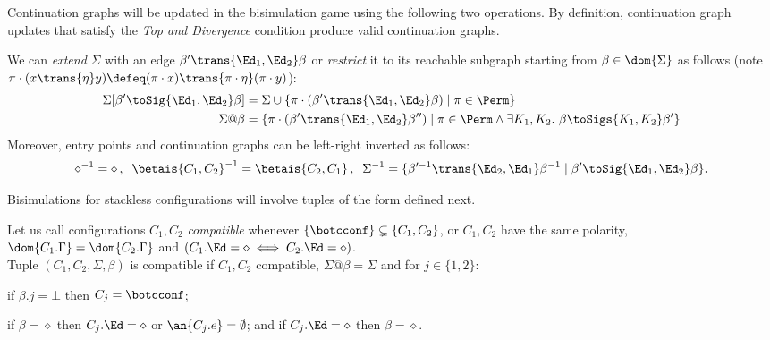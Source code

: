 Continuation graphs will be updated in the bisimulation game using the following two operations.
{By definition, continuation graph updates that satisfy the \emph{Top and Divergence} condition produce valid continuation graphs.}
\begin{definition}\label{def:sigma-ext-restr}
  We can \emph{extend} $\Sigma$ with an edge $\beta'\trans{\Ed_1,\Ed_2}\beta$ or \emph{restrict} it to its reachable subgraph starting from $\beta\in\dom{\Sigma}$ as follows (note $\pi\cdot(x\trans{\eta}y)\defeq(\pi\cdot x)\trans{\pi\cdot\eta}(\pi\cdot y)$):
\begin{align*}
  \Sigma[\beta'\toSig{\Ed_1,\Ed_2}\beta] &=  \Sigma\cup\{\pi\cdot(\beta'\trans{\Ed_1,\Ed_2}\beta)\mid \pi\in\Perm\}\\ %
  \Sigma@\beta &= \{\pi\cdot(\beta'\trans{\Ed_1,\Ed_2}\beta'')\mid\pi\in\Perm\land\exists K_1,K_2.\ \beta\toSigs{K_1,K_2}\beta'\}
\end{align*}
      Moreover, entry points and continuation graphs can be left-right inverted as follows:
\begin{align*}
  \diamond^{-1}=\diamond\,,\;\;
  \betais{C_1,C_2}^{-1} = 
\betais{C_2,C_1}\,,\;\;
  \Sigma^{-1} = \{\beta'^{-1}\trans{\Ed_2,\Ed_1}\beta^{-1}\mid \beta'\toSig{\Ed_1,\Ed_2}\beta\}.
\end{align*}
\end{definition}
%
Bisimulations for stackless configurations will involve tuples of the form defined next.

\begin{definition} \label{def:compatible-conf}\label{def:compatible}
  Let us call configurations $C_1,C_2$ \emph{compatible} whenever $\{\botcconf\}\subsetneq\{C_1,C_2\}$, or
  $C_1,C_2$ have the same polarity,
    $\dom{C_1.\Gamma}=
    \dom{C_2.\Gamma}$ and $(C_1.\Ed=\diamond\iff C_2.\Ed=\diamond)
    $.\\
Tuple $(C_1,C_2,\Sigma,\beta)$ is  {compatible} if
  $C_1,C_2$ compatible, %
    $\Sigma@\beta=\Sigma$ and
  for $j\in\{1,2\}$:
  \begin{compactenum}
  \item[($\bot$)] if $\beta.j=\bot$ then $C_j=\botcconf$;
    \item[($\diamond$)] if $\beta=\diamond$ then $C_j.\Ed=\diamond$ or $\an{C_j.e}=\emptyset$; and if $C_j.\Ed=\diamond$ then $\beta=\diamond$.
    \end{compactenum}
\end{definition}


